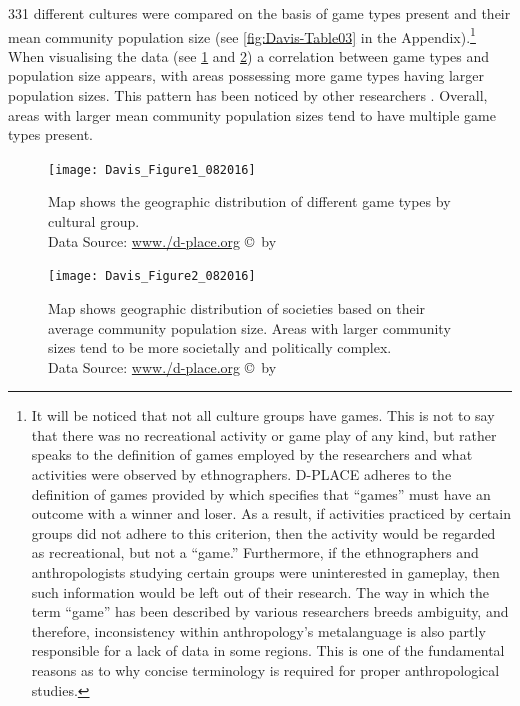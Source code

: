 \documentclass[%
	]{ijsra}
\begin{document}
331 different cultures were compared on the basis of game types present and their mean community population size (see \cref{fig:Davis-Table03} in the Appendix).\footnote{It will be noticed that not all culture groups have games. This is not to say that there was no recreational activity or game play of any kind, but rather speaks to the definition of games employed by the researchers and what activities were observed by ethnographers. D-PLACE adheres to the definition of games provided by \textcite{roberts1959} which specifies that ``games” must have an outcome with a winner and loser. As a result, if activities practiced by certain groups did not adhere to this criterion, then the activity would be regarded as recreational, but not a ``game.” Furthermore, if the ethnographers and anthropologists studying certain groups were uninterested in gameplay, then such information would be left out of their research. The way in which the term ``game” has been described by various researchers breeds ambiguity, and therefore, inconsistency within anthropology’s metalanguage is also partly responsible for a lack of data in some regions. This is one of the fundamental reasons as to why concise terminology is required for proper anthropological studies.} When visualising the data (see \cref{fig:Figure1_Davis_082016} and \cref{fig:Figure2_Davis_082016}) a correlation between game types and population size appears, with areas possessing more game types having larger population sizes. This pattern has been noticed by other researchers \parencites{ball1972}[322]{chick1984}[195]{chick1998}{roberts1959}. Overall, areas with larger mean community population sizes tend to have multiple game types present.

\begin{figure}[!htb] %
	\centering
	\texttt{[image: Davis\_Figure1\_082016]}
	\caption{Map shows the geographic distribution of different game types by cultural group.
	{\normalfont\scriptsize \\ Data Source: \href{http:/www./d-place.org}{www./d-place.org} \copyright\ by 
                 \shortauthor
                  }}
	\label{fig:Figure1_Davis_082016}
\end{figure}

\begin{figure}[!htb] %
	\centering
	\texttt{[image: Davis\_Figure2\_082016]}
	\caption{Map shows geographic distribution of societies based on their average community population size. Areas with larger community sizes tend to be more societally and politically complex.
	{\normalfont\scriptsize \\ Data Source: \href{http:/www./d-place.org}{www./d-place.org} \copyright\ by 
                 \shortauthor
                  }}
	\label{fig:Figure2_Davis_082016}
\end{figure}
\end{document}
